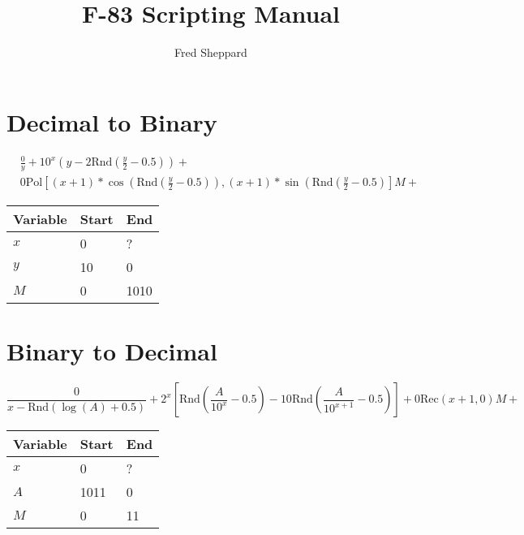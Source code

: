 \documentclass[11pt]{article}
\newcommand{\Rnd}{\text{Rnd}}
\newcommand{\Pol}{\text{Pol}}
\newcommand{\Rec}{\text{Rec}}
\begin{document}
    \title{F-83 Scripting Manual}
    \author{Fred Sheppard}
    \maketitle{}
    \pagebreak


    \section{Decimal to Binary}\label{sec:decimal-to-binary}
    \[
        \begin{align}
            &\frac{0}{y} + 10^x \left(y-2\Rnd\left(\frac{y}{2}-0.5\right)\right) + \\
            &0\Pol\left[\left(x+1\right) * \cos \left(\Rnd\left(\frac{y}{2}-0.5\right)\right),
            \left(x+1\right) * \sin \left(\Rnd\left(\frac{y}{2}-0.5\right)\right] M+
        \end{align}
    \]
    \begin{tabular}{|l|l|l|}
        \hline
        Variable & Start & End\\
        \hline
        $x$ & 0 & ?\\
        \hline
        $y$ & 10 & 0\\
        \hline
        $M$ & 0 & 1010\\
        \hline
    \end{tabular}

    \section{Binary to Decimal}\label{sec:binary-to-decimal}
    \[
        \frac {0} { x - \Rnd\left( \log \left( A \right) + 0.5 \right) } +
        2^x \left[ \Rnd \left( \frac{A} {10^x} - 0.5 \right) -10\Rnd \left( \frac{A}{10^{x+1}}-0.5 \right)\right]
        + 0\Rec \left( x+1, 0 \right) M+
    \]
    \begin{tabular}{|l|l|l|}
        \hline
        Variable & Start & End\\
        \hline
        $x$ & 0 & ?\\
        \hline
        $A$ & 1011 & 0\\
        \hline
        $M$ & 0 & 11\\
        \hline
    \end{tabular}
\end{document}
